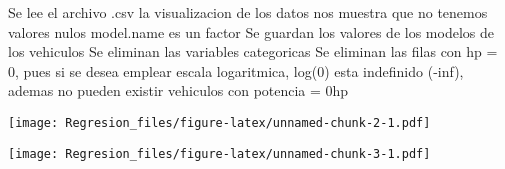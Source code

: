 \documentclass[]{article}
\newenvironment{Shaded}{\begin{snugshade}}{\end{snugshade}}
\newcommand{\CommentTok}[1]{\textcolor[rgb]{0.56,0.35,0.01}{\textit{#1}}}
\newcommand{\DataTypeTok}[1]{\textcolor[rgb]{0.13,0.29,0.53}{#1}}
\newcommand{\DecValTok}[1]{\textcolor[rgb]{0.00,0.00,0.81}{#1}}
\newcommand{\KeywordTok}[1]{\textcolor[rgb]{0.13,0.29,0.53}{\textbf{#1}}}
\newcommand{\NormalTok}[1]{#1}
\newcommand{\OperatorTok}[1]{\textcolor[rgb]{0.81,0.36,0.00}{\textbf{#1}}}
\newcommand{\StringTok}[1]{\textcolor[rgb]{0.31,0.60,0.02}{#1}}
\begin{document}
Se lee el archivo .csv la visualizacion de los datos nos muestra que no
tenemos valores nulos model.name es un factor Se guardan los valores de
los modelos de los vehiculos Se eliminan las variables categoricas Se
eliminan las filas con hp = 0, pues si se desea emplear escala
logaritmica, log(0) esta indefinido (-inf), ademas no pueden existir
vehiculos con potencia = 0hp

\begin{Shaded}
\end{Shaded}

\texttt{[image: Regresion\_files/figure-latex/unnamed-chunk-2-1.pdf]}

\begin{Shaded}
\end{Shaded}

\begin{Shaded}
\end{Shaded}

\texttt{[image: Regresion\_files/figure-latex/unnamed-chunk-3-1.pdf]}

\begin{Shaded}
\end{Shaded}
\end{document}

